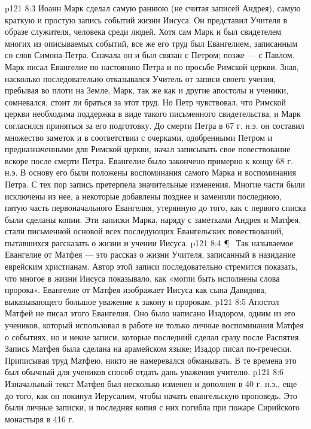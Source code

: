\vs p121 8:3 \bibnobreakspace {} Иоанн Марк сделал самую раннюю (не считая записей Андрея), самую краткую и простую запись событий жизни Иисуса. Он представил Учителя в образе служителя, человека среди людей. Хотя сам Марк и был свидетелем многих из описываемых событий, все же его труд был Евангелием, записанным со слов Симона\hyp{}Петра. Сначала он и был связан с Петром; позже --- с Павлом. Марк писал Евангелие по настоянию Петра и по просьбе Римской церкви. Зная, насколько последовательно отказывался Учитель от записи своего учения, пребывая во плоти на Земле, Марк, так же как и другие апостолы и ученики, сомневался, стоит ли браться за этот труд. Но Петр чувствовал, что Римской церкви необходима поддержка в виде такого письменного свидетельства, и Марк согласился приняться за его подготовку. До смерти Петра в 67 г. н.э. он составил множество заметок и в соответствии с очерками, одобренными Петром и предназначенными для Римской церкви, начал записывать свое повествование вскоре после смерти Петра. Евангелие было закончено примерно к концу 68 г. н.э. В основу его были положены воспоминания самого Марка и воспоминания Петра. С тех пор запись претерпела значительные изменения. Многие части были исключены из нее, а некоторые добавлены позднее и заменили последнюю, пятую часть первоначального Евангелия, утерянную до того, как с первого списка были сделаны копии. Эти записки Марка, наряду с заметками Андрея и Матфея, стали письменной основой всех последующих Евангельских повествований, пытавшихся рассказать о жизни и учении Иисуса.
\vs p121 8:4 \P\ \bibnobreakspace {} Так называемое Евангелие от Матфея --- это рассказ о жизни Учителя, записанный в назидание еврейским христианам. Автор этой записи последовательно стремится показать, что многое в жизни Иисуса показывало, как «могли быть исполнены слова пророка». Евангелие от Матфея изображает Иисуса как сына Давидова, выказывающего большое уважение к закону и пророкам.
\vs p121 8:5 Апостол Матфей не писал этого Евангелия. Оно было написано Изадором, одним из его учеников, который использовал в работе не только личные воспоминания Матфея о событиях, но и некие записи, которые последний сделал сразу после Распятия. Запись Матфея была сделана на арамейском языке; Изадор писал по\hyp{}гречески. Приписывая труд Матфею, никто не намеревался обманывать. В те времена это был обычный для учеников способ отдать дань уважения учителю.
\vs p121 8:6 Изначальный текст Матфея был несколько изменен и дополнен в 40 г. н.э., еще до того, как он покинул Иерусалим, чтобы начать евангельскую проповедь. Это были личные записки, и последняя копия с них погибла при пожаре Сирийского монастыря в 416 г.
